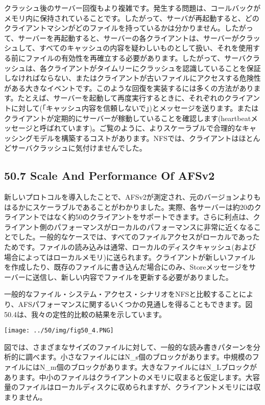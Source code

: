 クラッシュ後のサーバー回復もより複雑です。発生する問題は、コールバックがメモリ内に保持されていることです。したがって、サーバが再起動すると、どのクライアントマシンがどのファイルを持っているかは分かりません。したがって、サーバーを再起動すると、サーバーの各クライアントは、サーバーがクラッシュして、すべてのキャッシュの内容を疑わしいものとして扱い、それを使用する前にファイルの有効性を再確立する必要があります。したがって、サーバクラッシュは、各クライアントがタイムリーにクラッシュを認識していることを保証しなければならない、またはクライアントが古いファイルにアクセスする危険性がある大きなイベントです。このような回復を実装するには多くの方法があります。たとえば、サーバーを起動して再度実行するときに、それぞれのクライアントに対して(「キャッシュ内容を信頼しないで」)とメッセージを送ります。またはクライアントが定期的にサーバーが稼動していることを確認します(heartbeatメッセージと呼ばれています)。ご覧のように、よりスケーラブルで合理的なキャッシングモデルを構築するコストがあります。NFSでは、クライアントはほとんどサーバクラッシュに気付けませんでした。

\hypertarget{scale-and-performance-of-afsv2}{%
\subsection*{50.7 Scale And Performance Of
AFSv2}\label{scale-and-performance-of-afsv2}}

新しいプロトコルを導入したことで、AFSv2が測定され、元のバージョンよりもはるかにスケーラブルであることがわかりました。実際、各サーバーは約20のクライアントではなく約50のクライアントをサポートできます。さらに利点は、クライアント側のパフォーマンスがローカルのパフォーマンスに非常に近くなることでした。一般的なケースでは、すべてのファイルアクセスがローカルであったためです。ファイルの読み込みは通常、ローカルのディスクキャッシュ(および場合によってはローカルメモリ)に送られます。クライアントが新しいファイルを作成したり、既存のファイルに書き込んだ場合にのみ、Storeメッセージをサーバーに送信し、新しい内容でファイルを更新する必要がありました。

一般的なファイル・システム・アクセス・シナリオをNFSと比較することにより、AFSパフォーマンスに関するいくつかの見通しを得ることもできます。図50.4は、我々の定性的比較の結果を示しています。

\texttt{[image: ../50/img/fig50\_4.PNG]}

図では、さまざまなサイズのファイルに対して、一般的な読み書きパターンを分析的に調べます。小さなファイルにはN\_s個のブロックがあります。中規模のファイルにはN\_m個のブロックがあります。大きなファイルにはN\_Lブロックがあります。中小のファイルはクライアントのメモリに収まると仮定します。大容量のファイルはローカルディスクに収められますが、クライアントメモリには収まりません。

